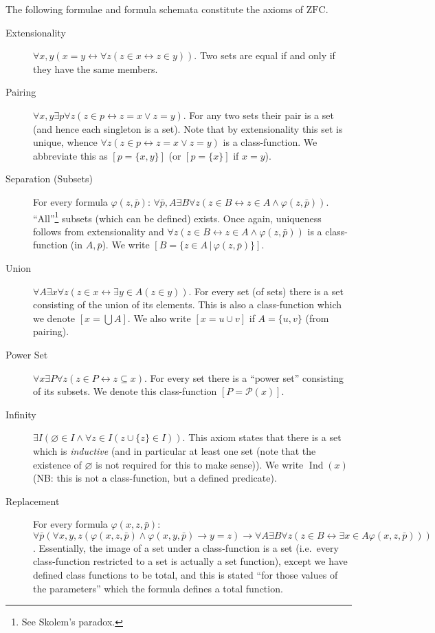 \documentclass{scrartcl}
\theoremstyle{definition}
\theoremstyle{plain}
\theoremstyle{remark}
\newcommand{\ZFC}{\ensuremath{\mathrm{ZFC}}}
\newcommand{\limp}{\rightarrow}
\newcommand{\liff}{\leftrightarrow}
\newcommand{\Pow}{\mathcal{P}}
\newcommand{\sep}{\,|\,}
\DeclareMathOperator{\Ind}{Ind}
\begin{document}
The following formulae and formula schemata constitute the axioms of $\ZFC$.
\begin{description}
\item[Extensionality] $\forall x, y (x = y \liff \forall z (z \in x \liff z \in y))$. Two sets are equal if and only if they have the same members.
\item[Pairing] $\forall x, y \exists p \forall z (z \in p \liff z = x \lor z = y)$. For any two sets their pair is a set (and hence each singleton is a set). Note that by extensionality this set is unique, whence $\forall z (z \in p \liff z = x \lor z = y)$ is a class-function. We abbreviate this as $[p = \{x,y\}]$ (or $[p = \{x\}]$ if $x = y$).
\item[Separation (Subsets)] For every formula $\varphi(z,\bar{p})$: $\forall \bar{p}, A \exists B \forall z (z \in B \liff z \in A \land \varphi(z,\bar{p}))$. ``All''\footnote{See Skolem's paradox.} subsets (which can be defined) exists. Once again, uniqueness follows from extensionality and $\forall z (z \in B \liff z \in A \land \varphi(z,\bar{p}))$ is a class-function (in $A,\bar{p}$). We write $[B = \{z \in A \sep \varphi(z,\bar{p})\}]$.
\item[Union] $\forall A \exists x \forall z (z \in x \liff \exists y \in A (z \in y))$. For every set (of sets) there is a set consisting of the union of its elements. This is also a class-function which we denote $[x = \bigcup A]$. We also write $[x = u \cup v]$ if $A = \{u,v\}$ (from pairing).
\item[Power Set] $\forall x \exists P \forall z (z \in P \liff z \subseteq x)$. For every set there is a ``power set'' consisting of its subsets. We denote this class-function $[P = \Pow(x)]$.
\item[Infinity] $\exists I (\varnothing \in I \land \forall z \in I (z \cup \{z\} \in I))$. This axiom states that there is a set which is \emph{inductive} (and in particular at least one set (note that the existence of $\varnothing$ is not required for this to make sense)). We write $\Ind(x)$ (NB: this is not a class-function, but a defined predicate).
\item[Replacement] For every formula $\varphi(x,z,\bar{p})$: $\forall \bar{p} (\forall x, y, z (\varphi(x,z,\bar{p}) \land \varphi(x,y,\bar{p}) \limp y = z) \limp \forall A \exists B \forall z (z \in B \liff \exists x \in A \varphi(x,z,\bar{p})))$. Essentially, the image of a set under a class-function is a set (i.e.~every class-function restricted to a set is actually a set function), except we have defined class functions to be total, and this is stated ``for those values of the parameters'' which the formula defines a total function.

\end{description}
\end{document}
